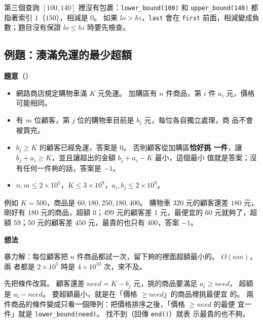 
第三個查詢 $[100, 140]$ 裡沒有包裹：\texttt{lower\_bound(100)} 和
\texttt{upper\_bound(140)} 都指著索引 $1$（$150$），相減是 $0$。 如果
$lo > hi$，\texttt{last} 會在 \texttt{first} 前面，相減變成負數；題目沒有保證
$lo \le hi$ 時要先檢查。

\subsection{例題：湊滿免運的最少超額}
\label{sec:srt-ex-topup}

\textbf{題意}（）

\begin{itemize}
\item 網路商店規定購物車滿 $K$ 元免運。 加購區有 $n$ 件商品，第 $i$ 件 $a_i$
元，價格可能相同。
\item 有 $m$ 位顧客，第 $j$ 位的購物車目前是 $b_j$ 元，每位各自獨立處理，商
品不會被買完。
\item $b_j \ge K$ 的顧客已經免運，答案是 $0$。 否則顧客從加購區\textbf{恰好挑
一件}，讓 $b_j + a_i \ge K$，並且讓超出的金額 $b_j + a_i - K$ 最小，這個最小
值就是答案；沒有任何一件夠的話，答案是 $-1$。
\item $n, m \le 2 \times 10^5$，$K \le 3 \times 10^9$，$a_i, b_j \le 2 \times
10^9$。
\end{itemize}

例如 $K = 500$，商品是 $60, 180, 250, 180, 400$。 購物車 $320$ 元的顧客還差
$180$ 元，剛好有 $180$ 元的商品，超額 $0$；$499$ 元的顧客差 $1$ 元，最便宜的
$60$ 元就夠了，超額 $59$；$50$ 元的顧客差 $450$ 元，最貴的也只有 $400$，答案
$-1$。

\textbf{想法}

暴力解：每位顧客把 $n$ 件商品都試一次，留下夠的裡面超額最小的。 $O(nm)$，兩
者都是 $2 \times 10^5$ 時是 $4 \times 10^{10}$ 次，來不及。

先把條件改寫。 顧客還差 $need = K - b_j$ 元，挑的商品要滿足 $a_i \ge need$，
超額是 $a_i - need$。 要超額最小，就是在「價格 $\ge need$」的商品裡挑最便宜
的。 兩件商品的條件變成只看一個陣列：把價格排序之後，「價格 $\ge need$ 的最便
宜一件」就是 \texttt{lower\_bound(need)}。 找不到（回傳 \texttt{end()}）就表
示最貴的也不夠。

